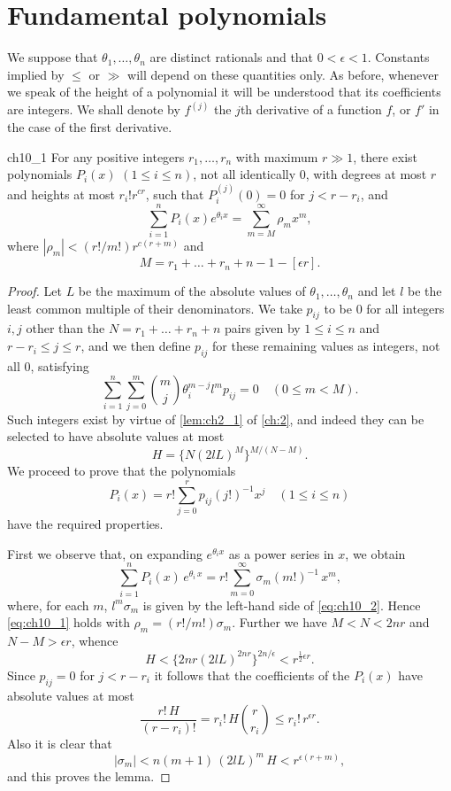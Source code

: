 \section{Fundamental polynomials}\label{sec:ch10_2}

We suppose that $\theta_1, \ldots, \theta_n$ are distinct rationals and that $0 < \epsilon < 1$. Constants implied by $\leqslant$ or $\gg$ will depend on these quantities only. As before, whenever we speak of the height of a polynomial it will be understood that its coefficients are integers. We shall denote by $f^{(j)}$ the $j$th derivative of a function $f$, or $f'$ in the case of the first derivative.

\begin{mylemma}{}{ch10_1}
For any positive integers $r_1, \ldots, r_n$ with maximum $r \gg 1$, there exist polynomials $P_i(x)$ $(1 \leq i \leq n)$, not all identically 0, with degrees at most $r$ and heights at most $r_i! r^{cr}$, such that $P_i^{(j)}(0) = 0$ for $j < r - r_i$, and
\[\sum_{i=1}^{n} P_i(x) e^{\theta_i x} = \sum_{m=M}^{\infty} \rho_m x^m, \tag{1}\label{eq:ch10_1}\]
where $|\rho_m| < (r!/m!) r^{c(r+m)}$ and
\[M = r_1 + \ldots + r_n + n - 1 - [\epsilon r].\]
\end{mylemma}

\begin{proof}
Let $L$ be the maximum of the absolute values of $\theta_1, \ldots, \theta_n$ and let $l$ be the least common multiple of their denominators. We take $p_{ij}$ to be 0 for all integers $i, j$ other than the $N = r_1 + \ldots + r_n + n$ pairs given by $1 \le i \le n$ and $r - r_i \le j \le r$, and we then define $p_{ij}$ for these remaining values as integers, not all 0, satisfying
\[\sum_{i=1}^{n} \sum_{j=0}^{m} \binom{m}{j} \theta_{i}^{m-j} l^{m} p_{ij} = 0 \quad (0 \leq m < M). \tag{2}\label{eq:ch10_2}\]
Such integers exist by virtue of \autoref{lem:ch2_1} of \autoref{ch:2}, and indeed they can be selected to have absolute values at most
\[H = \{N(2lL)^{M}\}^{M/(N-M)}.\]
We proceed to prove that the polynomials
\[P_{i}(x) = r! \sum_{j=0}^{r} p_{ij}(j!)^{-1} x^{j} \quad (1 \leq i \leq n)\]
have the required properties.

First we observe that, on expanding $e^{\theta_i x}$ as a power series in $x$, we obtain
\[\sum_{i=1}^n P_i(x)\,e^{\theta_i\,x} = r! \sum_{m=0}^\infty \sigma_m(m!)^{-1}\,x^m,\]
where, for each $m$, $l^m \sigma_m$ is given by the left-hand side of \eqref{eq:ch10_2}. Hence \eqref{eq:ch10_1} holds with $\rho_m = (r!/m!) \sigma_m$. Further we have $M < N < 2nr$ and $N - M > \epsilon r$, whence
\[H < \{2nr(2lL)^{2nr}\}^{2n/\epsilon} < r^{\frac{1}{2}\epsilon r}.\]
Since $p_{ij} = 0$ for $j < r - r_i$ it follows that the coefficients of the $P_i(x)$ have absolute values at most
\[\frac{r!\,H}{(r-r_i)!} = r_i!\,H\binom{r}{r_i}\leqslant r_i!\,r^{\epsilon r}.\]
Also it is clear that
\[\left|\sigma_{m}\right| < n(m+1) \, (2lL)^{m} \, H < r^{\epsilon(r+m)},\]
and this proves the lemma.
\end{proof}

